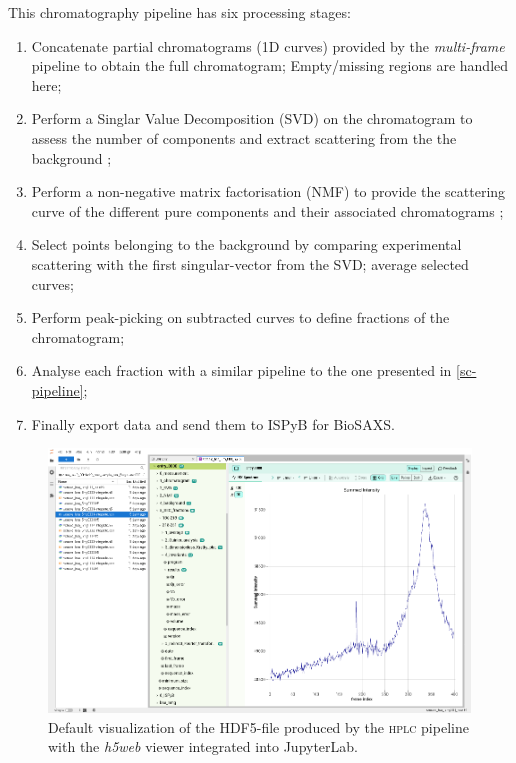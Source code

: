 \documentclass[preprint]{iucr}              %
\begin{document}
This chromatography pipeline has six processing stages:
\begin{enumerate}
    \item Concatenate partial chromatograms (1D curves) provided by the \textit{multi-frame} pipeline to obtain the full chromatogram; Empty/missing regions are handled here;
    \item Perform a Singlar Value Decomposition (SVD) on the chromatogram to assess the number of components and extract scattering from the the background \cite{BioXTAS}; 
    \item Perform a non-negative matrix factorisation (NMF) to provide the scattering curve of the different pure components and their associated chromatograms \cite{NMF-SEC_SAXS}; 
    \item Select points belonging to the background by comparing experimental scattering with the first singular-vector from the SVD; average selected curves; %
    \item Perform peak-picking on subtracted curves to define fractions of the chromatogram; 
    \item Analyse each fraction with a similar pipeline to the one presented in \ref{sc-pipeline}; %
    \item Finally export data and send them to ISPyB for BioSAXS.
\end{enumerate}

\begin{figure}
    \label{hplc}
    \includegraphics[width=12cm]{HPLC-h5web.eps}
    \caption{Default visualization of the HDF5-file produced by the \textsc{hplc} pipeline with the \textit{h5web} viewer integrated into JupyterLab.}
\end{figure}
\end{document}
